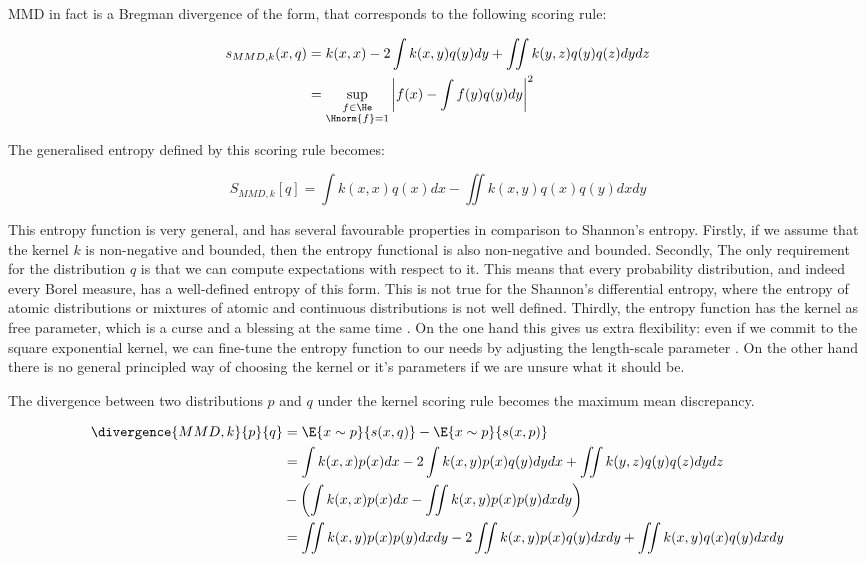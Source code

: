 MMD in fact is a Bregman divergence of the form, that corresponds to the following scoring rule:

\begin{align}
	s_{MMD,k}(x,q) &= k(x,x) - 2 \int k(x,y) q(y) dy + \iint k(y,z) q(y) q(z) dy dz\\
		&=  \sup_{\substack{f\in\He\\\Hnorm{f}=1}}\left\vert f(x)- \int f(y) q(y) dy\right\vert^2
\end{align}

The generalised entropy defined by this scoring rule becomes:

\begin{equation}
	S_{MMD,k}[q] = \int k(x,x) q(x) dx - \iint k(x,y) q(x) q(y) dx dy
\end{equation}

This entropy function is very general, and has several favourable properties in comparison to Shannon's entropy. Firstly, if we assume that the kernel $k$ is non-negative and bounded, then the entropy functional is also non-negative and bounded. Secondly, The only requirement for the distribution $q$ is that we can compute expectations with respect to it. This means that every probability distribution, and indeed every Borel measure, has a well-defined entropy of this form. This is not true for the Shannon's differential entropy, where the entropy of atomic distributions or mixtures of atomic and continuous distributions is not well defined. Thirdly, the entropy function has the kernel as free parameter, which is a curse and a blessing at the same time . On the one hand this gives us extra flexibility: even if we commit to the square exponential kernel, we can fine-tune the entropy function to our needs by adjusting the length-scale parameter \cite{tailoring}. On the other hand there is no general principled way of choosing the kernel or it's parameters if we are unsure what it should be.

The divergence between two distributions $p$ and $q$ under the kernel scoring rule becomes the maximum mean discrepancy.

\begin{align}
	\divergence{MMD,k}{p}{q} &= \E{x\sim p}{s(x,q)} - \E{x\sim p}{s(x,p)}\\ 
		&= \int k(x,x) p(x) dx - 2 \int k(x,y) p(x) q(y) dy dx + \iint k(y,z) q(y) q(z) dy dz\\
		&- \left( \int k(x,x) p(x) dx - \iint k(x,y) p(x) p(y) dx dy\right)\\
		&=  \iint k(x,y) p(x) p(y) dx dy	-2 \iint k(x,y) p(x) q(y) dx dy + \iint k(x,y) q(x) q(y) dx dy
\end{align}

